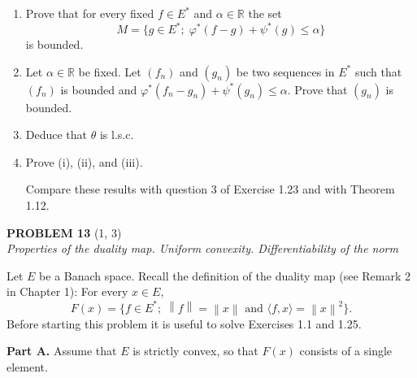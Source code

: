 \documentclass[12pt]{article}
\newcommand{\norm}[1]{\left\|#1\right\|}
\newcommand{\ip}[2]{\langle #1, #2 \rangle}
\newcommand{\R}{\mathbb{R}}
\begin{document}
\begin{enumerate}
\item Prove that for every fixed $f \in E^*$ and $\alpha \in \R$ the set
\[
M = \{g \in E^*;\; \varphi^*(f-g) + \psi^*(g) \le \alpha\}
\]
is bounded.


\item Let $\alpha \in \R$ be fixed. Let $(f_n)$ and $(g_n)$ be two sequences in $E^*$ such that
$(f_n)$ is bounded and $\varphi^*(f_n - g_n) + \psi^*(g_n) \le \alpha$. Prove that $(g_n)$ is bounded.

\item Deduce that $\theta$ is l.s.c.

\item Prove (i), (ii), and (iii).

Compare these results with question 3 of Exercise 1.23 and with Theorem 1.12.
\end{enumerate}

\bigskip

\noindent\textbf{PROBLEM 13} (1, 3)\\[4pt]
\textit{Properties of the duality map. Uniform convexity. Differentiability of the norm}

\medskip

Let $E$ be a Banach space. Recall the definition of the duality map (see Remark 2 in Chapter 1):
For every $x \in E$,
\[
F(x) = \{f \in E^*;\; \norm{f} = \norm{x} \text{ and } \ip{f}{x} = \norm{x}^2\}.
\]
Before starting this problem it is useful to solve Exercises 1.1 and 1.25.

\medskip

\noindent\textbf{Part A.} Assume that $E$ is strictly convex, so that $F(x)$ consists of a single element.
\end{document}
